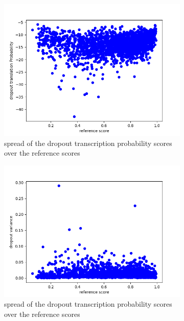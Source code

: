 \begin{figure}
    \centering
    \begin{subfigure}{0.4\linewidth}
        \includegraphics[width=\textwidth]{Latex/sections/images/seamlessdropprob.png}
        \caption{spread of the dropout transcription probability scores over the reference scores}
    \end{subfigure}
    \begin{subfigure}{0.4\linewidth}
        \includegraphics[width=\textwidth]{Latex/sections/images/seamlessdropoutvariance.png}
        \caption{spread of the dropout transcription probability scores over the reference scores}
    \end{subfigure}
    \begin{subfigure}{0.4\linewidth}

\end{subfigure}
\end{figure}
